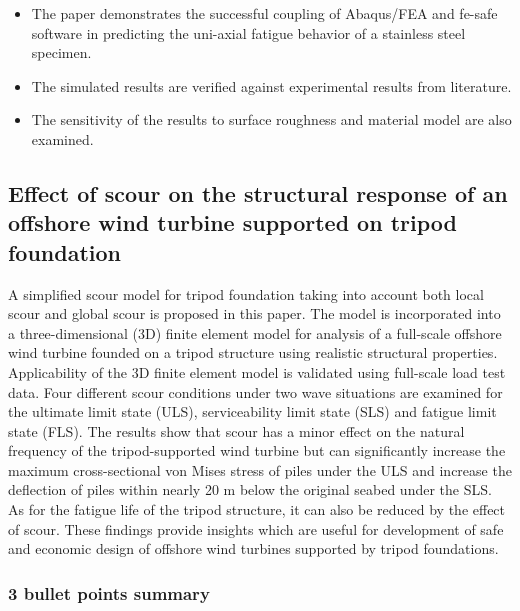 \documentclass[
  letterpaper,
  DIV=11,
  numbers=noendperiod]{scrreprt}
\providecommand{\tightlist}{%
  \setlength{\itemsep}{0pt}\setlength{\parskip}{0pt}}\usepackage{longtable,booktabs,array}
\begin{document}
\begin{itemize}
\tightlist
\item
  The paper demonstrates the successful coupling of Abaqus/FEA and
  fe-safe software in predicting the uni-axial fatigue behavior of a
  stainless steel specimen.
\item
  The simulated results are verified against experimental results from
  literature.
\item
  The sensitivity of the results to surface roughness and material model
  are also examined.
\end{itemize}

\hypertarget{effect-of-scour-on-the-structural-response-of-an-offshore-wind-turbine-supported-on-tripod-foundation}{%
\subsection{Effect of scour on the structural response of an offshore
wind turbine supported on tripod
foundation}\label{effect-of-scour-on-the-structural-response-of-an-offshore-wind-turbine-supported-on-tripod-foundation}}

A simplified scour model for tripod foundation taking into account both
local scour and global scour is proposed in this paper. The model is
incorporated into a three-dimensional (3D) finite element model for
analysis of a full-scale offshore wind turbine founded on a tripod
structure using realistic structural properties. Applicability of the 3D
finite element model is validated using full-scale load test data. Four
different scour conditions under two wave situations are examined for
the ultimate limit state (ULS), serviceability limit state (SLS) and
fatigue limit state (FLS). The results show that scour has a minor
effect on the natural frequency of the tripod-supported wind turbine but
can significantly increase the maximum cross-sectional von Mises stress
of piles under the ULS and increase the deflection of piles within
nearly 20 m below the original seabed under the SLS. As for the fatigue
life of the tripod structure, it can also be reduced by the effect of
scour. These findings provide insights which are useful for development
of safe and economic design of offshore wind turbines supported by
tripod foundations.

\hypertarget{bullet-points-summary-5}{%
\subsubsection{3 bullet points summary}\label{bullet-points-summary-5}}
\end{document}
